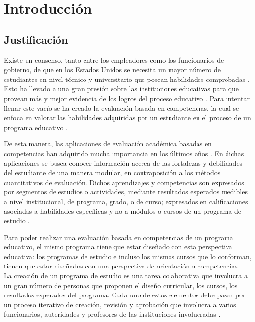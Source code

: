 \section{Introducción}

\subsection{Justificación}
Existe un consenso, tanto entre los empleadores como los funcionarios de gobierno, de que en los Estados Unidos se necesita un mayor número de estudiantes en nivel técnico y universitario que posean habilidades comprobadas \citep{kuh_knowing_2014}. Esto ha llevado a una gran presión sobre las instituciones educativas para que provean más y mejor evidencia de los logros del proceso educativo \citep{kuh_knowing_2014}. Para intentar llenar este vacío se ha creado la evaluación basada en competencias, la cual se enfoca en valorar las habilidades adquiridas por un estudiante en el proceso de un programa educativo \citep{cartwright2009student}.
 
De esta manera, las aplicaciones de evaluación académica basadas en competencias han adquirido mucha importancia en los últimos años \citep{barrio_minton_evaluating_2016}. En dichas aplicaciones se busca conocer información acerca de las fortalezas y debilidades del estudiante de una manera modular, en contraposición a los métodos cuantitativos de evaluación. Dichos aprendizajes y competencias son expresados por segmentos de estudios o actividades, mediante resultados esperados medibles a nivel institucional, de programa, grado, o de curso; expresados en calificaciones asociadas a habilidades específicas y no a módulos o cursos de un programa de estudio \citep{kuh_using_2015}. 
 
Para poder realizar una evaluación basada en competencias de un programa educativo, el mismo programa tiene que estar diseñado con esta perspectiva educativa: los programas de estudio e incluso los mismos cursos que lo conforman, tienen que estar diseñados con una perspectiva de orientación a competencias \citep{lalor_ensuring_2017}. La creación de un programa de estudio es una tarea colaborativa que involucra a un gran número de personas que proponen el diseño curricular, los cursos, los resultados esperados del programa. Cada uno de estos elementos debe pasar por un proceso iterativo de creación, revisión y aprobación que involucra a varios funcionarios, autoridades y profesores de las instituciones involucradas \citep{boyle_curriculum_2016}. 
 
